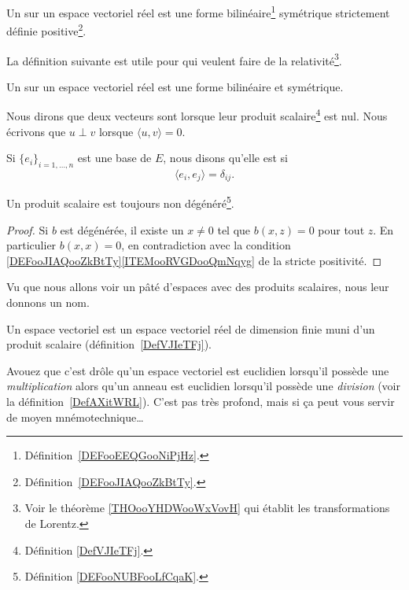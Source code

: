\begin{definition}\label{DefVJIeTFj}
	Un  sur un espace vectoriel réel est une forme bilinéaire\footnote{Définition~\ref{DEFooEEQGooNiPjHz}.} symétrique strictement définie positive\footnote{Définition~\ref{DEFooJIAQooZkBtTy}.}.
\end{definition}

La définition suivante est utile pour  qui veulent faire de la relativité\footnote{Voir le théorème \ref{THOooYHDWooWxVovH} qui établit les transformations de Lorentz.}.
\begin{definition}      \label{DEFooLPBGooXLxubc}
	Un  sur un espace vectoriel réel est une forme bilinéaire et symétrique.
\end{definition}

\begin{definition}      \label{DEFooZBWTooIqXwRp}
	Nous dirons que deux vecteurs sont  lorsque leur produit scalaire\footnote{Définition \ref{DefVJIeTFj}.} est nul. Nous écrivons que \( u\perp v\) lorsque \( \langle u, v\rangle =0\).

	Si \( \{ e_i \}_{i=1,\ldots, n}\) est une base de \( E\), nous disons qu'elle est  si
	\begin{equation}
		\langle e_i, e_j\rangle =\delta_{ij}.
	\end{equation}
\end{definition}

\begin{lemma}       \label{LEMooLPUFooVCvnwW}
	Un produit scalaire est toujours non dégénéré\footnote{Définition \ref{DEFooNUBFooLfCqaK}.}.
\end{lemma}

\begin{proof}
	Si \(  b\) est dégénérée, il existe un \( x\neq 0\) tel que \( b(x,z)=0\) pour tout \( z\). En particulier \( b(x,x)=0\), en contradiction avec la condition \ref{DEFooJIAQooZkBtTy}\ref{ITEMooRVGDooQmNqyg} de la stricte positivité.
\end{proof}


Vu que nous allons voir un pâté d'espaces avec des produits scalaires, nous leur donnons un nom.
\begin{definition}\label{DefLZMcvfj}
	Un espace vectoriel  est un espace vectoriel réel de dimension finie muni d'un produit scalaire (définition~\ref{DefVJIeTFj}).
\end{definition}
Avouez que c'est drôle qu'un espace vectoriel est euclidien lorsqu'il possède une \emph{multiplication} alors qu'un anneau est euclidien lorsqu'il possède une \emph{division} (voir la définition~\ref{DefAXitWRL}). C'est pas très profond, mais si ça peut vous servir de moyen mnémotechnique\ldots

